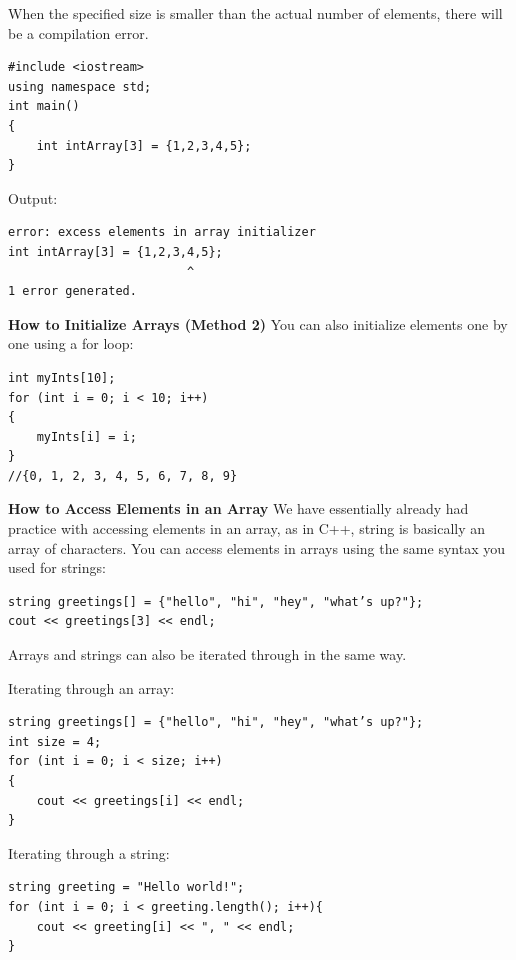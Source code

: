 \begin{example}
    When the specified size is smaller than the actual number of elements, there will be a compilation error.

    \begin{verbatim}
#include <iostream>
using namespace std;
int main()
{
    int intArray[3] = {1,2,3,4,5};
}
    \end{verbatim}

    Output:

    \begin{verbatim}
error: excess elements in array initializer
int intArray[3] = {1,2,3,4,5};
                         ^
1 error generated.
    \end{verbatim}
\end{example}

\textbf{How to Initialize Arrays (Method 2)} You can also initialize elements one by one using a for loop:

\begin{verbatim}
int myInts[10];
for (int i = 0; i < 10; i++)
{
    myInts[i] = i;
}
//{0, 1, 2, 3, 4, 5, 6, 7, 8, 9}
\end{verbatim}

\textbf{How to Access Elements in an Array} We have essentially already had practice with accessing elements in an array, as in C++, string is basically an array of characters. You can access elements in arrays using the same syntax you used for strings:

\begin{verbatim}
string greetings[] = {"hello", "hi", "hey", "what’s up?"};
cout << greetings[3] << endl;
\end{verbatim}

Arrays and strings can also be iterated through in the same way.

\begin{example}
    Iterating through an array:
    \begin{verbatim}
string greetings[] = {"hello", "hi", "hey", "what’s up?"};
int size = 4;
for (int i = 0; i < size; i++)
{
    cout << greetings[i] << endl;
}
    \end{verbatim}

    Iterating through a string:
    \begin{verbatim}
string greeting = "Hello world!";
for (int i = 0; i < greeting.length(); i++){
    cout << greeting[i] << ", " << endl;
}
    \end{verbatim}
\end{example}

